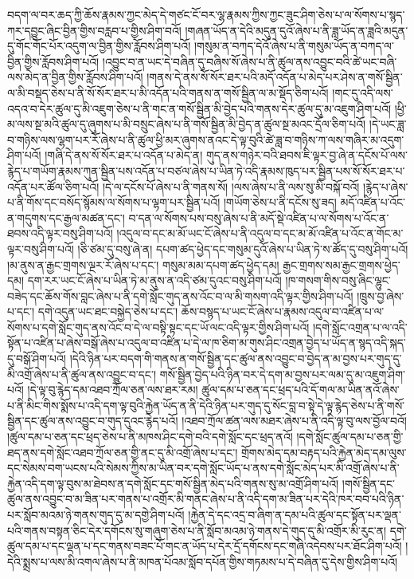 བདག་ལ་བར་ཆད་ཀྱི་ཆོས་རྣམས་ཀྱང་མེད་དེ་གཙང་ངོ་བར་ལྷ་རྣམས་ཀྱིས་ཀྱང་ཟུང་ཤིག་ཅེས་པ་ལ་སོགས་པ་སྙད་ཀར་དབྱུང་ཞིང་བྱིན་གྱིས་བརླབ་པ་གྱིས་ཤིག་བའོ། །གཞན་ཡོད་ན་དེའི་མདུན་དུའོ་ཞེས་པ་ནི་ཟླ་ཡོད་ན་ཟླའི་མདུན་དུ་གོང་གོང་པོར་འདུག་ལ་བྱིན་གྱིས་རློབས་ཤིག་པའོ། །གསུམ་ན་བཀད་དེའོ་ཞེས་པ་ནི་གསུམ་ཡོད་ན་བཀད་ལ་བྱིན་གྱིས་རློབས་ཤིག་པའོ། །འབྱུང་བ་ན་ཡང་དེ་བཞིན་དུ་བཞིས་སོ་ཞེས་པ་ནི་ཚུལ་ནས་འབྱུང་བའི་ཚེ་ཡང་བཞི་ལས་མེད་ན་བྱིན་གྱིས་རློབས་ཤིག་པའོ། །གནས་དེ་ནས་སོ་སོར་ཐར་པའི་མདོ་འདོན་པ་མེད་པར་ཤེས་ན་གསོ་སྦྱིན་ལ་མི་བསྡད་ཅེས་པ་ནི་སོ་སོར་ཐར་པ་མི་འདོན་པའི་གནས་ན་གསོ་སྦྱིན་ལ་མ་སྡོད་ཅིག་པའོ། །གང་དུ་འདི་ལས་འདའ་བ་དེར་ཚུལ་དུ་མི་འཇུག་ཅེས་པ་ནི་གང་ན་གསོ་སྦྱིན་མི་བྱེད་པའི་གནས་དེར་ཚུལ་དུ་མ་འཇུག་ཤིག་པའོ། །ཕྱི་མ་ལས་སྔ་མའི་ཚུལ་དུ་ཞུགས་པ་མི་བསྲུང་ཞེས་པ་ནི་གསོ་སྦྱིན་མི་བྱེད་ན་ཚུལ་སྔ་མའང་དྲོལ་ཅིག་པའོ། །དེ་ཡང་ཟླ་བ་གཉིས་ལས་ལྷག་པར་རོ་ཞེས་པ་ནི་ཚུལ་ཕྱི་མར་ཞུགས་ནའང་དེ་ལྟ་བུའི་ཚེ་ཟླ་བ་གཉིས་ཀ་ལས་གཞིར་མ་འདུག་ཤིག་པའོ། །གཞི་དེ་ནས་སོ་སོར་ཐར་པ་འདོན་པ་མེད་ན། གུད་ནས་གཉེར་བའི་ཐབས་ཇི་ལྟར་བྱ་ཞེ་ན་དངོས་པོ་ལས་རྙེད་པ་གཡོག་རྣམས་ཀུན་སྦྱིན་པས་འདོན་པ་བཙལ་ཞེས་པ་ཡིན་ཏེ་འདི་རྣམས་ཁུད་པར་སྦྱིན་པས་སོ་སོར་ཐར་པ་འདོན་པར་ཚོལ་ཅིག་པའོ། །དེ་ལ་དངོས་པོ་ཞེས་པ་ནི་གནས་སོ། །ལས་ཞེས་པ་ནི་ལས་སུ་མི་བསྐོ་བའོ། །རྙེད་པ་ཞེས་པ་ནི་གོས་དང་བསོད་སྙོམས་ལ་སོགས་པ་ལྷག་པར་སྦྱིན་པའོ། །གཡོག་ཅེས་པ་ནི་དངོས་སུ་ཟད། མདོ་འཛིན་པ་འོང་ན་གདུགས་དང་རྒྱལ་མཚན་དང་། བ་དན་ལ་སོགས་པས་བསུ་ཞེས་པ་ནི་མདོ་སྡེ་འཛིན་པ་ལ་སོགས་པ་འོང་ན་ཐབས་འདི་ལྟར་བསུ་ཤིག་པའོ། །འདུལ་བ་དང་མ་མོ་ཡང་ངོ་ཞེས་པ་ནི་འདུལ་བ་དང་མ་མོ་འཛིན་པ་འོང་ན་གོང་མ་ལྟར་བསུ་ཤིག་པའོ། །ཅི་ཙམ་དུ་བསུ་ཞེ་ན། དཔག་ཚད་ཕྱེད་དང་གསུམ་དུའོ་ཞེས་པ་ཡིན་ཏེ་ས་ཚོད་དུ་བསུ་ཤིག་པའོ། །མ་ནུས་ན་རྒྱང་གྲགས་ལྔར་རོ་ཞེས་པ་དང་། གསུམ་མམ་དཔག་ཚད་ཕྱེད་དམ། རྒྱང་གྲགས་སམ་རྒྱང་གྲགས་ཕྱེད་དམ། དག་རར་ཡང་ངོ་ཞེས་པ་ཡིན་ཏེ་མ་ནུས་ན་འདི་ཙམ་དུའང་བསུ་ཤིག་པའོ། །ཁ་གསག་གིས་བསུ་ཞིང་ལྷུང་བཟེད་དང་ཆོས་གོས་བླང་ཞེས་པ་ནི་དགེ་སློང་གུད་ནས་འོང་བ་ལ་མི་གསག་འདི་ལྟར་གྱིས་ཤིག་པའོ། །ཁྲུས་བྱ་ཞེས་པ་དང་། དགེ་འདུན་ཡང་ཐང་བསྐྱེད་ཅེས་པ་དང་། ཆོས་བསྙད་པ་ཡང་ངོ་ཞེས་པ་རྣམས་འདུལ་བ་འཛིན་པ་ལ་སོགས་པ་དགེ་སློང་གུད་ནས་འོང་བ་དེ་ལ་བསྟི་སྟང་དང་ཡོ་ལང་འདི་ལྟར་གྱིས་ཤིག་པའོ། །དགེ་སློང་འགྲན་པ་ལ་འདི་སྟོན་པ་འཛིན་པ་ཞེས་བསྒོ་ཞེས་པ་འདུལ་བ་འཛིན་པ་དེ་ལ་ཁ་ཅིག་མ་གུས་ཤིང་འགྲན་བྱེད་པ་ཡོད་ན་སྙད་འདི་སྐད་དུ་བསྒོ་ཤིག་པའོ། །དེའི་ཉིན་པར་བདག་གི་གནས་ན་གསོ་སྦྱིན་དང་ཚུལ་ནས་འབྱུང་བ་བྱེད་ན་མ་བྱས་པར་གུད་དུ་མི་འགྲོ་ཞེས་པ་ནི་ཚུལ་ནས་འབྱུང་བ་དང་། གསོ་སྦྱིན་བྱེད་པའི་ཉིན་བར་དེ་དག་མ་བྱས་པར་ལམ་དུ་མ་འཇུག་ཤིག་པའོ། །དེ་ལྟ་བུ་རྙེད་དམ་འཐབ་ཀྲོལ་ཅན་ལས་ཐར་རམ། ཚུལ་དམ་པ་ཅན་དང་ཕྲད་པའི་དོ་གལ་མ་ཡིན་ནའོ་ཞེས་པ་ནི་མིང་གིས་སྨོས་པ་འདི་དག་ལྟ་བུའི་རྐྱེན་ཡོད་ན་ནི་དེའི་ཉིན་པར་གུད་དུ་སོང་བླ་བ་སྟེ་དེ་ལྟ་རྙེད་ཅེས་པ་ནི་གསོ་སྦྱིན་དང་ཚུལ་ནས་འབྱུང་བ་གུད་དུའང་རྙེད་པའོ། །འཐབ་ཀྲོལ་ཚན་ལས་མཐར་ཞེས་པ་ནི་འདི་ལྟ་བུ་ལས་བྱོལ་བའོ། །ཚུལ་དམ་པ་ཅན་དང་ཕྲད་ཅེས་པ་ནི་མཁས་ཤིང་དགེ་བའི་དགེ་སློང་དང་ཕྲད་ནའོ། །དགེ་སློང་ཚུལ་དམ་པ་ཅན་གྱི་ཐད་ནས་དགེ་སློང་འཐབ་ཀྲོལ་ཅན་གྱི་ནང་དུ་མི་འགྲོ་ཞེས་པ་དང་། གྲོགས་མེད་དམ་བརྟད་པའི་རྐྱེན་མེད་དམ་ལུས་དང་སེམས་བག་ཡངས་པའི་སེམས་ཀྱིས་མ་ཡིན་བར་དགེ་སློང་ཡོད་པ་ནས་དགེ་སློང་མེད་པར་མི་འགྲོ་ཞེས་པ་ནི་རྐྱེན་འདི་དག་ལྟ་བུས་མ་ཐེབས་ན་དགེ་སློང་དང་གསོ་སྦྱིན་མེད་པའི་གནས་སུ་མ་འགྲོ་ཤིག་པའོ། །གསོ་སྦྱིན་དང་ཚུལ་ནས་འབྱུང་བ་མ་ཟིན་པར་གནས་པ་འགྲོར་མི་གནང་ཞེས་པ་ནི་འདི་དག་མ་ཟིན་པར་དེའི་ཁར་བབ་པའི་ཉིན་པར་སློབ་མའམ་ཉེ་གནས་གུད་དུ་མ་དགྱེ་ཤིག་པའོ། །རྐྱེན་དེ་དང་འདྲ་བ་ཞིག་ན་དམ་པའི་ཚུལ་དང་སྟོན་པར་ལྡན་པའི་གནས་བསྟན་ཅིང་དེར་དགོངས་སུ་གཞུག་ཅེས་པ་ནི་སློབ་མའམ་ཉེ་གནས་དེ་གུད་དུ་མི་འགྲོར་མི་རུང་ན། དགེ་ཚུལ་དམ་པ་དང་ལྡན་པ་དང་གནས་བཟང་པོ་གང་ན་ཡོད་པ་དེར་དྲོ་དགོངས་དང་གཞི་འདེབས་པར་ཐོང་ཤིག་པའོ། །དེའི་སྨྲས་པ་ལས་མི་འགལ་ཞེས་པ་ནི་མཁན་པོའམ་སློབ་དཔོན་གྱིས་གཏམས་པ་དེ་བཞིན་དུ་དེས་གྱིས་ཤིག་པའོ། 